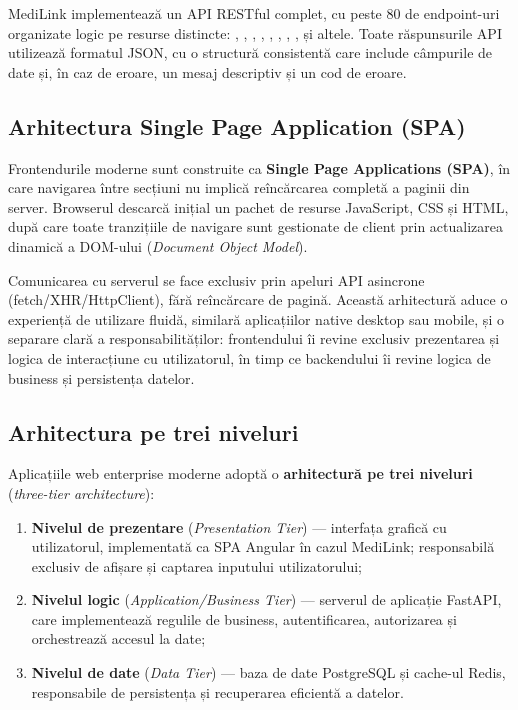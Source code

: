 MediLink implementează un API RESTful complet, cu peste 80 de endpoint-uri organizate logic pe resurse distincte: , , , , , , , ,  și altele. Toate răspunsurile API utilizează formatul JSON, cu o structură consistentă care include câmpurile de date și, în caz de eroare, un mesaj descriptiv și un cod de eroare.

\subsection{Arhitectura Single Page Application (SPA)}

Frontendurile moderne sunt construite ca \textbf{Single Page Applications (SPA)}, în care navigarea între secțiuni nu implică reîncărcarea completă a paginii din server. Browserul descarcă inițial un pachet de resurse JavaScript, CSS și HTML, după care toate tranzițiile de navigare sunt gestionate de client prin actualizarea dinamică a DOM-ului (\textit{Document Object Model}).

Comunicarea cu serverul se face exclusiv prin apeluri API asincrone (fetch/XHR/HttpClient), fără reîncărcare de pagină. Această arhitectură aduce o experiență de utilizare fluidă, similară aplicațiilor native desktop sau mobile, și o separare clară a responsabilităților: frontendului îi revine exclusiv prezentarea și logica de interacțiune cu utilizatorul, în timp ce backendului îi revine logica de business și persistența datelor.

\subsection{Arhitectura pe trei niveluri}

Aplicațiile web enterprise moderne adoptă o \textbf{arhitectură pe trei niveluri} (\textit{three-tier architecture}):

\begin{enumerate}
  \item \textbf{Nivelul de prezentare} (\textit{Presentation Tier}) --- interfața grafică cu utilizatorul, implementată ca SPA Angular în cazul MediLink; responsabilă exclusiv de afișare și captarea inputului utilizatorului;
  \item \textbf{Nivelul logic} (\textit{Application/Business Tier}) --- serverul de aplicație FastAPI, care implementează regulile de business, autentificarea, autorizarea și orchestrează accesul la date;
  \item \textbf{Nivelul de date} (\textit{Data Tier}) --- baza de date PostgreSQL și cache-ul Redis, responsabile de persistența și recuperarea eficientă a datelor.
\end{enumerate}

